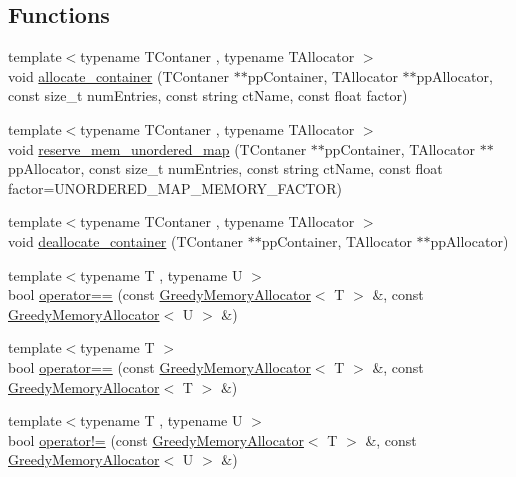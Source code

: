 \subsection*{Functions}
\begin{DoxyCompactItemize}
\item 
{\footnotesize template$<$typename T\+Contaner , typename T\+Allocator $>$ }\\void \hyperlink{namespaceuva_1_1smt_1_1tries_1_1alloc_a06a0b287f69168d8f3eaa4eafd7a8513}{allocate\+\_\+container} (T\+Contaner $\ast$$\ast$pp\+Container, T\+Allocator $\ast$$\ast$pp\+Allocator, const size\+\_\+t num\+Entries, const string ct\+Name, const float factor)
\item 
{\footnotesize template$<$typename T\+Contaner , typename T\+Allocator $>$ }\\void \hyperlink{namespaceuva_1_1smt_1_1tries_1_1alloc_a2c181932d57f2889db12f245097d3b96}{reserve\+\_\+mem\+\_\+unordered\+\_\+map} (T\+Contaner $\ast$$\ast$pp\+Container, T\+Allocator $\ast$$\ast$pp\+Allocator, const size\+\_\+t num\+Entries, const string ct\+Name, const float factor=U\+N\+O\+R\+D\+E\+R\+E\+D\+\_\+\+M\+A\+P\+\_\+\+M\+E\+M\+O\+R\+Y\+\_\+\+F\+A\+C\+T\+O\+R)
\item 
{\footnotesize template$<$typename T\+Contaner , typename T\+Allocator $>$ }\\void \hyperlink{namespaceuva_1_1smt_1_1tries_1_1alloc_a8f63d24e724796c5c4daa555ee1f3bc7}{deallocate\+\_\+container} (T\+Contaner $\ast$$\ast$pp\+Container, T\+Allocator $\ast$$\ast$pp\+Allocator)
\item 
{\footnotesize template$<$typename T , typename U $>$ }\\bool \hyperlink{namespaceuva_1_1smt_1_1tries_1_1alloc_a9e2fd05ee524012c1fd4398fe457e5dc}{operator==} (const \hyperlink{classuva_1_1smt_1_1tries_1_1alloc_1_1_greedy_memory_allocator}{Greedy\+Memory\+Allocator}$<$ T $>$ \&, const \hyperlink{classuva_1_1smt_1_1tries_1_1alloc_1_1_greedy_memory_allocator}{Greedy\+Memory\+Allocator}$<$ U $>$ \&)
\item 
{\footnotesize template$<$typename T $>$ }\\bool \hyperlink{namespaceuva_1_1smt_1_1tries_1_1alloc_a4148e630799431da09b14782fea4cc96}{operator==} (const \hyperlink{classuva_1_1smt_1_1tries_1_1alloc_1_1_greedy_memory_allocator}{Greedy\+Memory\+Allocator}$<$ T $>$ \&, const \hyperlink{classuva_1_1smt_1_1tries_1_1alloc_1_1_greedy_memory_allocator}{Greedy\+Memory\+Allocator}$<$ T $>$ \&)
\item 
{\footnotesize template$<$typename T , typename U $>$ }\\bool \hyperlink{namespaceuva_1_1smt_1_1tries_1_1alloc_a49f57a5b2c27ce6e2b8da7f15d1d44ad}{operator!=} (const \hyperlink{classuva_1_1smt_1_1tries_1_1alloc_1_1_greedy_memory_allocator}{Greedy\+Memory\+Allocator}$<$ T $>$ \&, const \hyperlink{classuva_1_1smt_1_1tries_1_1alloc_1_1_greedy_memory_allocator}{Greedy\+Memory\+Allocator}$<$ U $>$ \&)

\end{DoxyCompactItemize}
